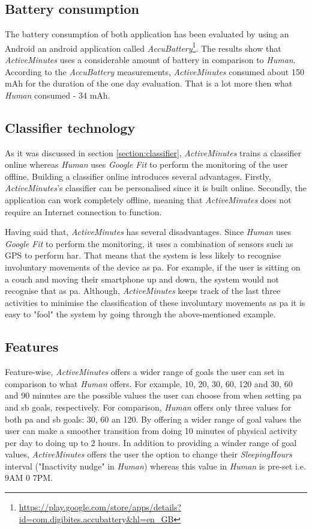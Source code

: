 \subsection{Battery consumption}
The battery consumption of both application has been evaluated by using an Android an android application called \textit{AccuBattery}\footnote{\url{https://play.google.com/store/apps/details?id=com.digibites.accubattery&hl=en_GB}}. The results show that \textit{ActiveMinutes} uses a considerable amount of battery in comparison to \textit{Human}. According to the \textit{AccuBattery} measurements, \textit{ActiveMinutes} consumed about 150 mAh for the duration of the one day evaluation. That is a lot more then what \textit{Human} consumed - 34 mAh.

\subsection{Classifier technology}
As it was discussed in section \ref{section:classifier}, \textit{ActiveMinutes} trains a classifier online whereas \textit{Human} uses \textit{Google Fit} to perform the monitoring of the user offline. Building a classifier online introduces several advantages. Firstly, \textit{ActiveMinutes}'s classifier can be personalised since it is built online. Secondly, the application can work completely offline, meaning that \textit{ActiveMinutes} does not require an Internet connection to function. 

Having said that, \textit{ActiveMinutes} has several disadvantages. Since \textit{Human} uses \textit{Google Fit} to perform the monitoring, it uses a combination of sensors such as GPS to perform \gls{har}. That means that the system is less likely to recognise involuntary movements of the device as \gls{pa}. For example, if the user is sitting on a couch and moving their smartphone up and down, the system would not recognise that as \gls{pa}. Although, \textit{ActiveMinutes} keeps track of the last three activities to minimise the classification of these involuntary movements as \gls{pa} it is easy to "fool" the system by going through the above-mentioned example.

\subsection{Features}
Feature-wise, \textit{ActiveMinutes} offers a wider range of goals the user can set in comparison to what \textit{Human} offers. For example, 10, 20, 30, 60, 120 and 30, 60 and 90 minutes are the possible values the user can choose from when setting \gls{pa} and \gls{sb} goals, respectively. For comparison, \textit{Human} offers only three values for both \gls{pa} and \gls{sb} goals: 30, 60 an 120. By offering a wider range of goal values the user can make a smoother transition from doing 10 minutes of physical activity per day to doing up to 2 hours. In addition to providing a winder range of goal values, \textit{ActiveMinutes} offers the user the option to change their \textit{SleepingHours} interval ("Inactivity nudge" in \textit{Human}) whereas this value in \textit{Human} is pre-set i.e. 9AM 0 7PM.


